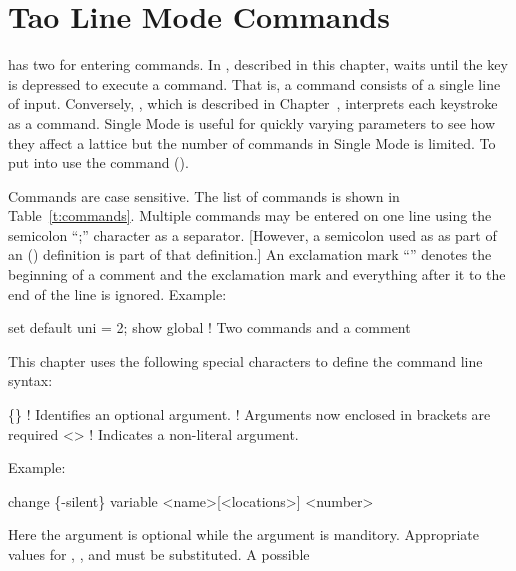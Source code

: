 \chapter{Tao Line Mode Commands}
\label{c:command}

\tao has two  for entering commands. In ,
described in this chapter, \tao waits until the  key is
depressed to execute a command. That is, a command consists of a
single line of input. Conversely, , which is described
in Chapter~, interprets each keystroke as a
command. Single Mode is useful for quickly varying parameters to see
how they affect a lattice but the number of commands in Single Mode is
limited. To put \tao into  use the 
command ().

Commands are case sensitive. The list of commands is shown in
Table~\ref{t:commands}. Multiple commands may be entered on one line
using the semicolon ``;'' character as a separator.  [However, a
semicolon used as as part of an  () definition
is part of that definition.]
An exclamation mark ``\vn{!}'' denotes the beginning of
a comment and the exclamation mark and everything after it to the end
of the line is ignored.  Example:
\begin{example}
  set default uni = 2; show global  ! Two commands and a comment
\end{example}

This chapter uses the following special characters to define the
command line syntax:
\begin{example}
  \{\}        ! Identifies an optional argument. 
              !   Arguments now enclosed in brackets are required
  <>        ! Indicates a non-literal argument.
\end{example}

Example:
\begin{example}
  change \{-silent\} variable <name>[<locations>] <number>
\end{example}
Here the  argument is optional while the  argument
is manditory. Appropriate values for , ,
and  must be substituted. A possible 


